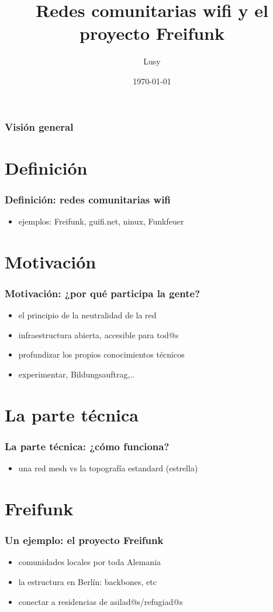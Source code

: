 \documentclass[12pt, xcolor=table]{beamer}
\begin{document}
\title{Redes comunitarias wifi y el proyecto Freifunk}
\author{Lusy}
\date{\today}

\begin{frame}
    \titlepage
\end{frame}

\begin{frame}
    \frametitle{Visión general}
    \tableofcontents
\end{frame}

\section{Definición}
\begin{frame}
  \frametitle{Definición: redes comunitarias wifi}
    \begin{itemize}
      \item ejemplos: Freifunk, guifi.net, ninux, Funkfeuer
    \end{itemize}
\end{frame}

\section{Motivación}
\begin{frame}
  \frametitle{Motivación: ¿por qué participa la gente?}
  \begin{itemize}
    \item el principio de la neutralidad de la red
    \item infraestructura abierta, accesible para tod@s
    \item profundizar los propios conocimientos técnicos
    \item experimentar, Bildungsauftrag,..
  \end{itemize}
\end{frame}

\section{La parte técnica}
\begin{frame}
  \frametitle{La parte técnica: ¿cómo funciona?}
    \begin{itemize}
      \item una red mesh vs la topografía estandard (estrella)
    \end{itemize}
\end{frame}

\section{Freifunk}
\begin{frame}
  \frametitle{Un ejemplo: el proyecto Freifunk}
  \begin{itemize}
    \item comunidades locales por toda Alemania
    \item la estructura en Berlín: backbones, etc
    \item conectar a residencias de asilad@s/refugiad@s
  \end{itemize}
\end{frame}
\end{document}
